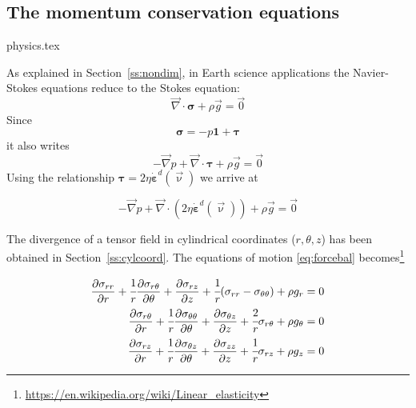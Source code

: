 \subsection{The momentum conservation equations} 
\begin{flushright} {\tiny {\color{gray} physics.tex}} \end{flushright}

As explained in Section~\ref{ss:nondim}, in Earth science applications the Navier-Stokes 
equations reduce to the Stokes equation:
\begin{equation}
{\vec \nabla}\cdot {\bm \sigma} + \rho {\vec g} = \vec{0}
\label{eq:forcebal}
\end{equation}
Since 
\begin{equation}
{\bm \sigma} = -p {\bm 1} + {\bm \tau}
\end{equation}
it also writes
\begin{equation}
-{\vec \nabla}p + {\vec \nabla}\cdot {\bm \tau} + \rho {\vec g} = \vec{0}
\end{equation}
Using the relationship ${\bm \tau} = 2 \eta \dot{\bm \varepsilon}^d(\vec\upnu)$ we arrive at 
\begin{mdframed}[backgroundcolor=blue!5]
\begin{equation}
-{\vec \nabla}p + {\vec \nabla}\cdot (2 \eta \dot{\bm \varepsilon}^d(\vec\upnu) ) + \rho {\vec g} = \vec{0}
\end{equation}
\end{mdframed}

The divergence of a tensor field in cylindrical coordinates ($r,\theta,z$)
has been obtained in Section~\ref{ss:cylcoord}.
The equations of motion \eqref{eq:forcebal} becomes\footnote{\url{https://en.wikipedia.org/wiki/Linear_elasticity}}

 \begin{align}
\frac{\partial \sigma_{rr}}{\partial r} + \cfrac{1}{r}\frac{\partial \sigma_{r\theta}}{\partial \theta} + \frac{\partial \sigma_{rz}}{\partial z} + \cfrac{1}{r}(\sigma_{rr}-\sigma_{\theta\theta}) + \rho g_r &= 0 \label{eq:momelr}\\
\frac{\partial \sigma_{r\theta}}{\partial r} + \cfrac{1}{r}\frac{\partial \sigma_{\theta\theta}}{\partial \theta} + \frac{\partial \sigma_{\theta z}}{\partial z} + \cfrac{2}{r}\sigma_{r\theta} + \rho g_\theta &=  0 \label{eq:momeltheta}\\
\frac{\partial \sigma_{rz}}{\partial r} + \cfrac{1}{r}\frac{\partial \sigma_{\theta z}}{\partial \theta} + \frac{\partial \sigma_{zz}}{\partial z} + \cfrac{1}{r}\sigma_{rz} + \rho g_z &= 0
\end{align}


